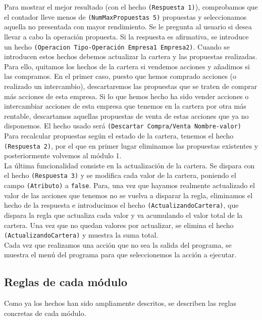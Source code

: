 \documentclass[11pt,leqno]{article}
\theoremstyle{definition_wo_parentheses}
\theoremstyle{plain}
\theoremstyle{remark}
\begin{document}
Para mostrar el mejor resultado (con el hecho \texttt{(Respuesta 1)}), comprobamos que el contador lleve menos de \texttt{(NumMaxPropuestas 5)} propuestas y seleccionamos aquella no presentada con mayor rendimiento. Se le pregunta al usuario si desea llevar a cabo la operación propuesta. Si la respuesta es afirmativa, se introduce un hecho \texttt{(Operacion Tipo-Operación Empresa1 Empresa2)}. Cuando se introducen estos hechos debemos actualizar la cartera y las propuestas realizadas. Para ello, quitamos los hechos de la cartera si vendemos acciones y añadimos si las compramos. En el primer caso, puesto que hemos comprado acciones (o realizado un intercambio), descartaremos las propuestas que se traten de comprar más acciones de esta empresa. Si lo que hemos hecho ha sido vender acciones o intercambiar acciones de esta empresa que tenemos en la cartera por otra más rentable, descartamos aquellas propuestas de venta de estas acciones que ya no disponemos. El hecho usado será \texttt{(Descartar Compra/Venta Nombre-valor)}\\

Para recalcular propuestas según el estado de la cartera, tenemos el hecho \texttt{(Respuesta 2)}, por el que en primer lugar eliminamos las propuestas existentes y posteriormente volvemos al módulo 1.\\

La última funcionalidad consiste en la actualización de la cartera. Se dispara con el hecho \texttt{(Respuesta 3)} y se modifica cada valor de la cartera, poniendo el campo \texttt{(Atributo)} a \texttt{false}. Para, una vez que hayamos realmente actualizado el valor de las acciones que tenemos no se vuelva a disparar la regla, eliminamos el hecho de la respuesta e introducimos el hecho \texttt{(ActualizandoCartera)}, que dispara la regla que actualiza cada valor y va acumulando el valor total de la cartera. Una vez que no quedan valores por actualizar, se elimina el hecho \texttt{(ActualizandoCartera)} y muestra la suma total.\\

Cada vez que realizamos una acción que no sea la salida del programa, se muestra el menú del programa para que seleccionemos la acción a ejecutar.

\subsection{Reglas de cada módulo}

	Como ya los hechos han sido ampliamente descritos, se describen las reglas concretas de cada módulo.
	
\end{document}
